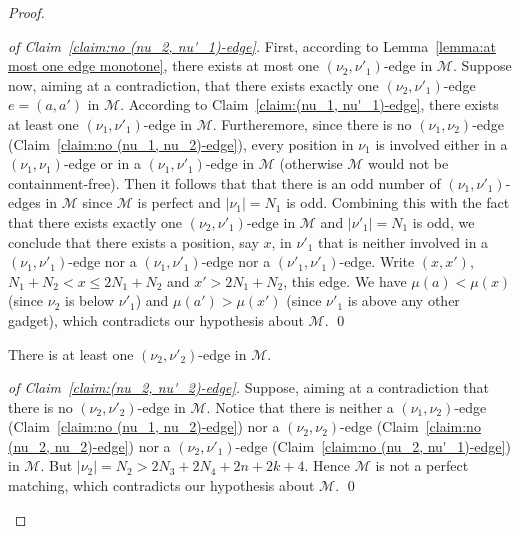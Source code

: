 \documentclass[a4paper]{llncs}
\begin{document}
\begin{proof}
  \begin{proof}[of Claim~\ref{claim:no (nu_2, nu'_1)-edge}]
    First, according to Lemma~\ref{lemma:at most one edge monotone},
    there exists at most one $(\nu_2, \nu'_1)$-edge in $\mathcal{M}$.
    Suppose now, aiming at a contradiction, that there exists
    exactly one $(\nu_2, \nu'_1)$-edge $e = (a, a')$ in $\mathcal{M}$.
    According to Claim~\ref{claim:(nu_1, nu'_1)-edge}, there exists at least
    one $(\nu_1, \nu'_1)$-edge in $\mathcal{M}$.
    Furtheremore, since
    there is no $(\nu_1, \nu_2)$-edge (Claim~\ref{claim:no (nu_1, nu_2)-edge}),
    every position in $\nu_1$ is involved either in a
    $(\nu_1, \nu_1)$-edge or in a $(\nu_1, \nu'_1)$-edge in $\mathcal{M}$
    (otherwise $\mathcal{M}$ would not be containment-free).
    Then it follows that that there is an odd number of $(\nu_1, \nu'_1)$-edges
    in $\mathcal{M}$ since $\mathcal{M}$ is perfect and $|\nu_1| = N_1$ is odd.
    Combining this with the fact that there exists exactly one $(\nu_2, \nu'_1)$-edge
    in $\mathcal{M}$ and $|\nu'_1| = N_1$ is odd,
    we conclude that there exists a position, say $x$, in $\nu'_1$
    that is neither involved in a $(\nu_1, \nu'_1)$-edge nor a $(\nu_1, \nu'_1)$-edge
    nor a $(\nu'_1, \nu'_1)$-edge.
    Write $(x, x')$, $N_1+N_2 < x \leq 2N_1 + N_2$ and $x' > 2N_1 + N_2$, this edge.
    We have $\mu(a) < \mu(x)$ (since $\nu_2$ is below $\nu'_1$)
    and $\mu(a') > \mu(x')$ (since $\nu'_1$ is above any other gadget),
    which contradicts our hypothesis about $\mathcal{M}$.
    \qed
  \end{proof}

  \begin{claim}
    \label{claim:(nu_2, nu'_2)-edge}
    There is at least one $(\nu_2, \nu'_2)$-edge in $\mathcal{M}$.
  \end{claim}

  \begin{proof}[of Claim~\ref{claim:(nu_2, nu'_2)-edge}]
    Suppose, aiming at a contradiction that there is no
    $(\nu_2, \nu'_2)$-edge in $\mathcal{M}$.
    Notice that there is neither
    a $(\nu_1, \nu_2)$-edge (Claim~\ref{claim:no (nu_1, nu_2)-edge})
    nor a $(\nu_2, \nu_2)$-edge (Claim~\ref{claim:no (nu_2, nu_2)-edge})
    nor a $(\nu_2, \nu'_1)$-edge (Claim~\ref{claim:no (nu_2, nu'_1)-edge})
    in $\mathcal{M}$.
    But $|\nu_2| = N_2 > 2N_3 + 2N_4 + 2n + 2k +4$.
    Hence $\mathcal{M}$ is not a perfect matching,
    which contradicts our hypothesis about $\mathcal{M}$.
    \qed
  \end{proof}


\end{proof}
\end{document}
